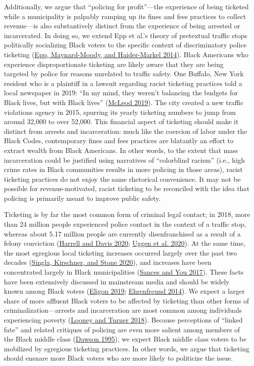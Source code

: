 \documentclass[
  12pt,
]{article}
\begin{document}
Additionally, we argue that ``policing for profit''---the experience of being ticketed while a municipality is palpably ramping up its fines and fees practices to collect revenue---is also substantively distinct from the experience of being arrested or incarcerated. In doing so, we extend Epp et al.'s theory of pretextual traffic stops politically socializing Black voters to the specific context of discriminatory police ticketing (\protect\hyperlink{ref-Epp2014}{Epp, Maynard-Moody, and Haider-Markel 2014}). Black Americans who experience disproportionate ticketing are likely aware that they are being targeted by police for reasons unrelated to traffic safety. One Buffalo, New York resident who is a plaintiff in a lawsuit regarding racist ticketing practices told a local newspaper in 2019: ``In my mind, they weren't balancing the budgets for Black lives, but with Black lives'' (\protect\hyperlink{ref-McLeod2019}{McLeod 2019}). The city created a new traffic violations agency in 2015, spurring its yearly ticketing numbers to jump from around 32,000 to over 52,000. This financial aspect of ticketing should make it distinct from arrests and incarceration: much like the coercion of labor under the Black Codes, contemporary fines and fees practices are blatantly an effort to extract wealth from Black Americans. In other words, to the extent that mass incarceration could be justified using narratives of ``colorblind racism'' (i.e., high crime rates in Black communities results in more policing in those areas), racist ticketing practices do not enjoy the same rhetorical convenience. It may not be possible for revenue-motivated, racist ticketing to be reconciled with the idea that policing is primarily meant to improve public safety.

Ticketing is by far the most common form of criminal legal contact; in 2018, more than 24 million people experienced police contact in the context of a traffic stop, whereas about 5.17 million people are currently disenfranchised as a result of a felony conviction (\protect\hyperlink{ref-Harrell2020}{Harrell and Davis 2020}; \protect\hyperlink{ref-Uggen2020}{Uggen et al. 2020}). At the same time, the most egregious local ticketing increases occurred largely over the past two decades (\protect\hyperlink{ref-Singla2020}{Singla, Kirschner, and Stone 2020}), and increases have been concentrated largely in Black municipalities (\protect\hyperlink{ref-Sances2017}{Sances and You 2017}). These facts have been extensively discussed in mainstream media and should be widely known among Black voters (\protect\hyperlink{ref-Eligon2019}{Eligon 2019}; \protect\hyperlink{ref-Ehrenfreund2014}{Ehrenfreund 2014}). We expect a larger share of more affluent Black voters to be affected by ticketing than other forms of criminalization---arrests and incarceration are most common among individuals experiencing poverty (\protect\hyperlink{ref-Looney2018}{Looney and Turner 2018}). Because perceptions of ``linked fate'' and related critiques of policing are even more salient among members of the Black middle class (\protect\hyperlink{ref-Dawson1995}{Dawson 1995}), we expect Black middle class voters to be mobilized by egregious ticketing practices. In other words, we argue that ticketing should ensnare more Black voters who are more likely to politicize the issue.
\end{document}
